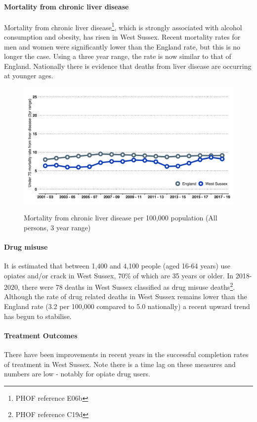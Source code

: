 \paragraph{Mortality from chronic liver disease} Mortality from chronic liver disease\footnote{PHOF reference E06b}, which is strongly associated with alcohol consumption and obesity, has risen in West Sussex. Recent mortality rates for men and women were significantly lower than the England rate, but this is no longer the case. Using a three year range, the rate is now similar to that of England. Nationally there is evidence that deaths from liver disease are occurring at younger ages.

\begin{figure}[ht]
    \caption{Mortality from chronic liver disease per 100,000 population (All persons, 3 year range)}
    \centering
    \includegraphics[width=\linewidth]{images/u75_liver_line.png}
    \label{fig:u75_liver}
\end{figure}

\paragraph{Drug misuse} It is estimated that between 1,400 and 4,100 people (aged 16-64 years) use opiates and/or crack in West Sussex, 70\% of which are 35 years or older. In 2018-2020, there were 78 deaths in West Sussex classified as drug misuse deaths\footnote{PHOF reference C19d}. Although the rate of drug related deaths in West Sussex remains lower than the England rate (3.2 per 100,000 compared to 5.0 nationally) a recent upward trend has begun to stabilise.

\paragraph{Treatment Outcomes}
There have been improvements in recent years in the successful completion rates of treatment in West Sussex. Note there is a time lag on these measures and numbers are low - notably for opiate drug users.

